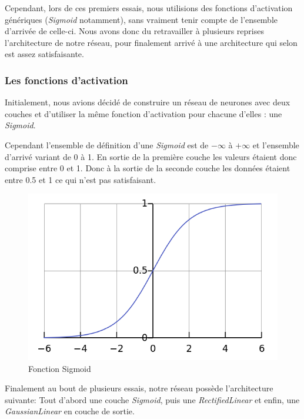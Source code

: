 \documentclass[12pt, a4paper]{article}
\begin{document}
Cependant, lors de ces premiers essais, nous utilisions des fonctions d'activation génériques (\emph{Sigmoid} notamment), sans vraiment tenir compte de l'ensemble d'arrivée de celle-ci. 
Nous avons donc du retravailler à plusieurs reprises l'architecture de notre réseau, pour finalement arrivé à une architecture qui selon est assez satisfaisante. 

	\subsubsection{Les fonctions d'activation}
Initialement, nous avions décidé de construire un réseau de neurones avec deux couches et d'utiliser la même fonction d'activation pour chacune d'elles : une \emph{Sigmoid}.

Cependant l'ensemble de définition d'une \emph{Sigmoid} est de $-\infty$ à $+\infty$ et l'ensemble d'arrivé variant de 0 à 1. En sortie de la première couche les valeurs étaient donc comprise entre 0 et 1. Donc à la sortie de la seconde couche les données étaient entre 0.5 et 1 ce qui n'est pas satisfaisant. 

\begin{figure}[h!]
  \centering
  \includegraphics[scale=0.4]{Images/sigmoid.png}
  \caption{Fonction Sigmoid}
\end{figure}

Finalement au bout de plusieurs essais, notre réseau possède l'architecture suivante:
Tout d'abord une couche \emph{Sigmoid}, puis une \emph{RectifiedLinear} et enfin, une \emph{GaussianLinear} en couche de sortie.
\\
\end{document}

